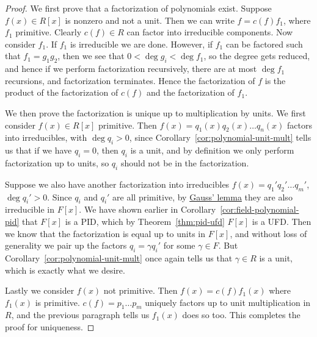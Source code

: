 \begin{proof}
    We first prove that a factorization of polynomials exist.
    Suppose \(f(x) \in R[x]\) is nonzero and not a unit.
    Then we can write \(f = c(f)f_1\), where \(f_1\) primitive.
    Clearly \(c(f) \in R\) can factor into irreducible components.
    Now consider \(f_1\).
    If \(f_1\) is irreducible we are done.
    However, if \(f_1\) can be factored such that \(f_1 = g_1 g_2\),
    then we see that \(0 < \deg g_i < \deg f_1\),
    so the degree gets reduced,
    and hence if we perform factorization recursively,
    there are at most \(\deg f_1\) recursions,
    and factorization terminates.
    Hence the factorization of \(f\)
    is the product of the factorization of \(c(f)\)
    and the factorization of \(f_1\).

    \medskip

    We then prove the factorization is unique up to multiplication by units.
    We first consider \(f(x) \in R[x]\) primitive.
    Then \(f(x) = q_1(x)q_2(x) \hdots q_n(x)\) factors into irreducibles,
    with \(\deg q_i > 0\),
    since Corollary~\ref{cor:polynomial-unit-mult} tells us that
    if we have \(q_i = 0\), then \(q_i\) is a unit,
    and by definition we only perform factorization up to units,
    so \(q_i\) should not be in the factorization.

    Suppose we also have another factorization into irreducibles
    \(f(x) = q_1' q_2' \hdots q_m'\), \(\deg q_i' > 0\).
    Since \(q_i\) and \(q_i'\) are all primitive,
    by \hyperref[lem:gauss-irreducible]{Gauss' lemma}
    they are also irreducible in \(F[x]\).
    We have shown earlier in Corollary~\ref{cor:field-polynomial-pid}
    that \(F[x]\) is a PID,
    which by Theorem~\ref{thm:pid-ufd} \(F[x]\) is a UFD.\@
    Then we know that the factorization is equal up to units in \(F[x]\),
    and without loss of generality we pair up the factors
    \(q_i = \gamma q_i'\) for some \(\gamma \in F\).
    But Corollary~\ref{cor:polynomial-unit-mult} once again tells us that
    \(\gamma \in R\) is a unit,
    which is exactly what we desire.

    Lastly we consider \(f(x)\) not primitive.
    Then \(f(x) = c(f)f_1(x)\) where \(f_1(x)\) is primitive.
    \(c(f) = p_1 \hdots p_m\) uniquely factors up to unit multiplication in \(R\),
    and the previous paragraph tells us \(f_1(x)\) does so too.
    This completes the proof for uniqueness.
\end{proof}

